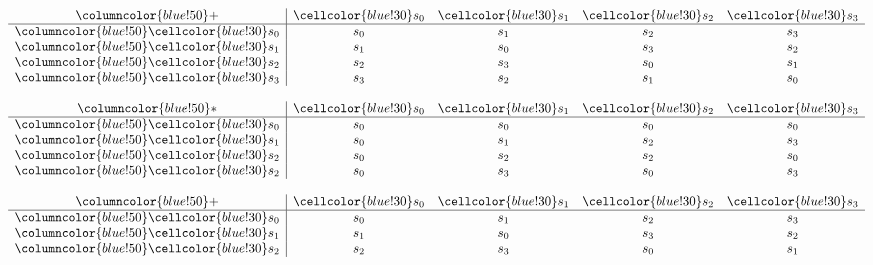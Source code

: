 \documentclass{article}
\begin{document}
\begin{center}
\begin{minipage}{0.23\textwidth}
    \centering
    \renewcommand{\arraystretch}{1.5} 
    \[
    \begin{array}{>{\columncolor{blue!50}}c|cccc}
    + & \cellcolor{blue!30}s_0 & \cellcolor{blue!30}s_1 & \cellcolor{blue!30}s_2 & \cellcolor{blue!30}s_3 \\ \hline
    \cellcolor{blue!30}s_0 & s_0 & s_1 & s_2 & s_3 \\
    \cellcolor{blue!30}s_1 & s_1 & s_0 & s_3 & s_2 \\
    \cellcolor{blue!30}s_2 & s_2 & s_3 & s_0 & s_1 \\
    \cellcolor{blue!30}s_3 & s_3 & s_2 & s_1 & s_0 \\
    \end{array}
    \]
\end{minipage}%
\hfill
\begin{minipage}{0.23\textwidth}
    \centering
    \renewcommand{\arraystretch}{1.5} 
    \[
    \begin{array}{>{\columncolor{blue!50}}c|cccc}
    * & \cellcolor{blue!30}s_0 & \cellcolor{blue!30}s_1 & \cellcolor{blue!30}s_2 & \cellcolor{blue!30}s_3 \\ \hline
    \cellcolor{blue!30}s_0 & s_0 & s_0 & s_0 & s_0 \\
    \cellcolor{blue!30}s_1 & s_0 & s_1 & s_2 & s_3 \\
    \cellcolor{blue!30}s_2 & s_0 & s_2 & s_2 & s_0 \\
    \cellcolor{blue!30}s_2 & s_0 & s_3 & s_0 & s_3 \\
    \end{array}
    \]
\end{minipage}
\hspace{0.75cm}
\begin{minipage}{0.23\textwidth}
    \centering
    \renewcommand{\arraystretch}{1.5} 
    \[
    \begin{array}{>{\columncolor{blue!50}}c|cccc}
    + & \cellcolor{blue!30}s_0 & \cellcolor{blue!30}s_1 & \cellcolor{blue!30}s_2 & \cellcolor{blue!30}s_3 \\ \hline
    \cellcolor{blue!30}s_0 & s_0 & s_1 & s_2 & s_3 \\
    \cellcolor{blue!30}s_1 & s_1 & s_0 & s_3 & s_2 \\
    \cellcolor{blue!30}s_2 & s_2 & s_3 & s_0 & s_1 \\

\end{array}\]
\end{minipage}
\end{center}
\end{document}

